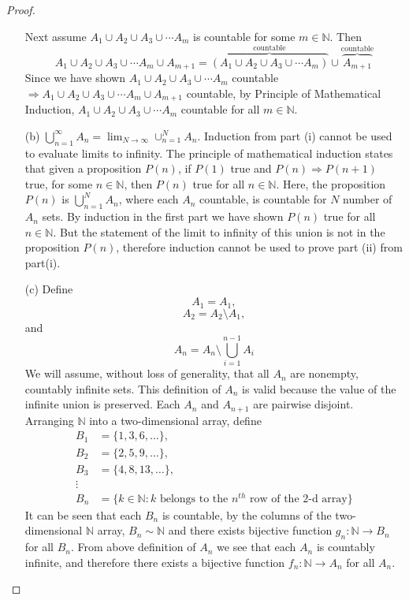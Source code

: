 \documentclass[11pt,twoside, reqno]{amsart}
\theoremstyle{remark}
\def\N{\mathbb N}
\renewcommand{\implies}{\Rightarrow}
\begin{document}
\begin{proof}
\begin{enumerate}
    Next assume $A_1 \cup A_2 \cup A_3 \cup \cdots A_m$ is countable for some $m \in \N$. Then
    $$
    A_1 \cup A_2 \cup A_3 \cup \cdots A_m \cup A_{m+1} = \overbrace{(A_1 \cup A_2 \cup A_3 \cup \cdots A_m)}^{\text{countable}} \cup \overbrace{A_{m+1}}^{\text{countable}}
    $$
    Since we have shown $A_1 \cup A_2 \cup A_3 \cup \cdots A_m$ countable $\implies A_1 \cup A_2 \cup A_3 \cup \cdots A_m \cup A_{m+1}$ countable, by Principle of Mathematical Induction, $A_1 \cup A_2 \cup A_3 \cup \cdots A_m$ countable for all $m \in \N$.
    \item[(b)] $\bigcup^\infty_{n=1} A_n = \lim_{N \to \infty} \cup^N_{n=1} A_n$. Induction from part (i) cannot be used to evaluate limits to infinity. The principle of mathematical induction states that given a proposition $P(n)$, if $P(1)$ true and $P(n) \implies P(n+1)$ true, for some $n \in \N$, then $P(n)$ true for all $n \in \N$. Here, the proposition $P(n)$ is $\bigcup^N_{n=1}A_n$, where each 
    $A_n$ countable, is countable for $N$ number of $A_n$ sets. By induction in the first part we have shown $P(n)$ true for all $n \in \N$. But the statement of the limit to infinity of this union is not in the proposition $P(n)$, therefore induction cannot be used to prove part (ii) from part(i).
    \item[(c)] Define
    $$
    A_1 = A_1,
    $$
    $$
    A_2 = A_2 \setminus A_1,
    $$
    and
    $$
    A_n = A_n \setminus \bigcup^{n-1}_{i=1} A_i
    $$
    We will assume, without loss of generality, that all $A_n$ are nonempty, countably infinite sets. This definition of $A_n$ is valid because the value of the infinite union is preserved. Each $A_n$ and $A_{n+1}$ are pairwise disjoint. Arranging $\N$ into a two-dimensional array, define
    \begin{align*}
        B_1 &= \{1,3,6,\ldots\},\\
        B_2 &= \{2,5,9,\ldots\},\\
        B_3 &= \{4,8,13,\ldots\},\\
        \vdots\\
        B_n &= \{k \in \N : k \text{ belongs to the $n^{th}$ row of the 2-d array}\}
    \end{align*}
    It can be seen that each $B_n$ is countable, by the columns of the two-dimensional $\N$ array, $B_n \sim \N$ and there exists bijective function $g_n: \N \to B_n$ for all $B_n$. From above  definition of $A_n$ we see that each $A_n$ is countably infinite, and therefore there exists a bijective function $f_n: \N \to A_n$ for all $A_n$.
    

\end{enumerate}
\end{proof}
\end{document}
